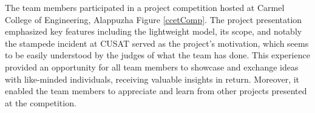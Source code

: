 \vspace{1cm}

\noindent The team members participated in a project competition hosted at Carmel College of Engineering, Alappuzha Figure \ref{ccetComp}. The project presentation emphasized key features including the lightweight model, its scope, and notably the stampede incident at CUSAT served as the project's motivation, which seems to be easily understood by the judges of what the team has done. This experience provided an opportunity for all team members to showcase and exchange ideas with like-minded individuals, receiving valuable insights in return. Moreover, it enabled the team members to appreciate and learn from other projects presented at the competition.\\





\renewcommand{\footrulewidth}{0.4pt}